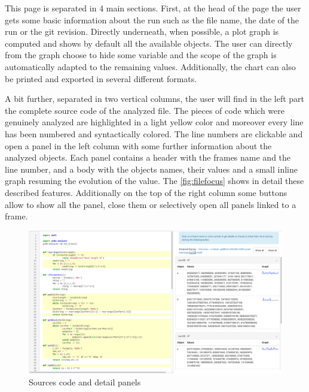 This page is separated in 4 main sections. First, at the head of the page the user gets some basic information about the run such as the file name, the date of the run or the git revision. Directly underneath, when possible, a plot graph is computed and shows by default all the available objects. The user can directly from the graph choose to hide some variable and the scope of the graph is automatically adapted to the remaining values. Additionally, the chart can also be printed and exported in several different formats.

A bit further, separated in two vertical columns, the user will find in the left part the complete source code of the analyzed file. The pieces of code which were genuinely analyzed are highlighted in a light yellow color and moreover every line has been numbered and syntactically colored. The line numbers are clickable and open a panel in the left column with some further information about the analyzed objects. Each panel contains a header with the frames name and the line number, and a body with the objects names, their values and a small inline graph resuming the evolution of the value. The \autoref{fig:filefocus} shows in detail these described features. Additionally on the top of the right column some buttons allow to show all the panel, close them or selectively open all panels linked to a frame.

\begin{figure}[h!]
  \centering
    \includegraphics[width=\textwidth]{figures/yoda-file-focus.png}
    \caption{Sources code and detail panels}
    \label{fig:filefocus}
\end{figure}

